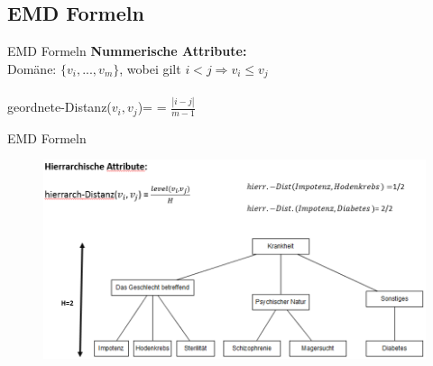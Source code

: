 \subsection{EMD Formeln} 
\begin{frame}{EMD Formeln}
	\textbf{Nummerische Attribute:} \\
	Domäne: $\{v_i,...,v_m\}$, wobei gilt $i<j \Rightarrow v_i \le v_j$\\
	\ \\
	geordnete-Distanz($v_i,v_j$)= = $\frac{|i-j|}{m-1}$
\end{frame}
\begin{frame}{EMD Formeln}
	\begin{figure}
		\includegraphics[scale=0.51]{pic/EMD_Formel.png}
	\end{figure}
\end{frame}

